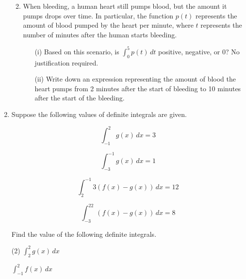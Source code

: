 \documentclass[11pt]{article}
\newcommand{\tasksA}[2]{\begin{tasks}(#1) #2 \end{tasks}} %
\begin{document}
\begin{enumerate}
\begin{enumerate}
\begin{enumerate}
        \vfill 
    \end{enumerate}

    \vfill

    \item When bleeding, a human heart still pumps blood, but the amount it pumps drops over time. In particular, the function $p(t)$ represents the amount of blood pumped by the heart per minute, where $t$ represents the number of minutes after the human starts bleeding.

    \begin{enumerate}
        \item[(i)] Based on this scenario, is $\displaystyle \int_0^5 p(t)\, dt$ positive, negative, or 0? No justification required.

        \vfill

        \item[(ii)] Write down an expression representing the amount of blood the heart pumps from 2 minutes after the start of bleeding to 10 minutes after the start of the bleeding.

        \vfill
    \end{enumerate}

    \vfill
\end{enumerate}



\newpage


\item Suppose the following values of definite integrals are given.

\[\int_{-1}^{2}g(x)\,dx=3\]

\[\int_{-3}^{-1}g(x)\,dx=1\]

\[\int_2^{-1}3(f(x)-g(x))\,dx=12\]

\[\int_{-3}^22(f(x)-g(x))\,dx=8\]

Find the value of the following definite integrals.

\tasksA{2}{
\task $\displaystyle\int_2^2 g(x)\, dx$

\task $\displaystyle\int_{-1}^2 f(x)\, dx$

\vspace{7cm}

}
\end{enumerate}
\end{document}
